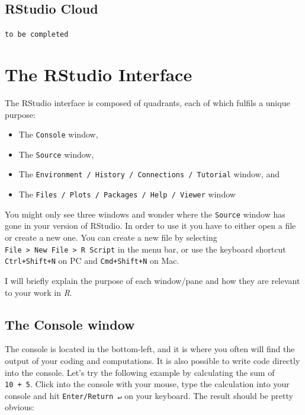 \documentclass[
]{book}
\begin{document}
\hypertarget{rstudio-cloud}{%
\section{RStudio Cloud}\label{rstudio-cloud}}

\texttt{to\ be\ completed}

\hypertarget{the-rstudio-interface}{%
\chapter{The RStudio Interface}\label{the-rstudio-interface}}

The RStudio interface is composed of quadrants, each of which fulfils a unique purpose:

\begin{itemize}
\item
  The \texttt{Console} window,
\item
  The \texttt{Source} window,
\item
  The \texttt{Environment\ /\ History\ /\ Connections\ /\ Tutorial} window, and
\item
  The \texttt{Files\ /\ Plots\ /\ Packages\ /\ Help\ /\ Viewer} window
\end{itemize}

You might only see three windows and wonder where the \texttt{Source} window has gone in your version of RStudio. In order to use it you have to either open a file or create a new one. You can create a new file by selecting \texttt{File\ \textgreater{}\ New\ File\ \textgreater{}\ R\ Script} in the menu bar, or use the keyboard shortcut \texttt{Ctrl+Shift+N} on PC and \texttt{Cmd+Shift+N} on Mac.

I will briefly explain the purpose of each window/pane and how they are relevant to your work in \emph{R}.

\hypertarget{the-console-window}{%
\section{The Console window}\label{the-console-window}}

The console is located in the bottom-left, and it is where you often will find the output of your coding and computations. It is also possible to write code directly into the console. Let's try the following example by calculating the sum of \texttt{10\ +\ 5}. Click into the console with your mouse, type the calculation into your console and hit \texttt{Enter/Return\ ↵} on your keyboard. The result should be pretty obvious:
\end{document}
